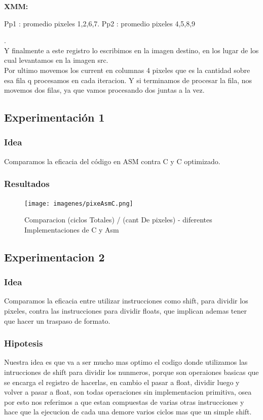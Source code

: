 \par{\textbf{XMM:}}
\par {Pp1 : promedio pixeles {1,2,6,7}. Pp2 : promedio pixeles {4,5,8,9}}
	
	
.\\ Y finalmente a este registro lo escribimos en la imagen destino, en los lugar de los cual levantamos en la imagen src. \\ Por ultimo movemos los current en columnas 4 pixeles que es la cantidad sobre esa fila q procesamos en cada iteracion. Y si terminamos de procesar la fila, nos movemos dos filas, ya que vamos procesando dos juntas a la vez.
	
\subsection{Experimentación 1}
\subsubsection{Idea}	
	Comparamos la eficacia del código en ASM contra C y C optimizado.
	
\subsubsection{Resultados}
	\begin{figure}[h!]
	\texttt{[image: imagenes/pixeAsmC.png]}
	\caption[center]{Comparacion (ciclos Totales) / (cant De pixeles) - diferentes Implementaciones de C y Asm}
\end{figure}

\subsection{Experimentacion 2}
\subsubsection{Idea}
Comparamos la eficacia entre utilizar instrucciones como shift, para dividir los pixeles, contra las instrucciones para dividir floats, que implican ademas tener que hacer un traspaso de formato.

\subsubsection{Hipotesis}
Nuestra idea es que va a ser mucho mas optimo el codigo donde utilizamos las intrucciones de shift para dividir los nunmeros, porque son operaiones basicas que se encarga el registro de hacerlas, en cambio el pasar a float, dividir luego y volver  a pasar a float, son todas operaciones sin implementacion primitiva, osea por esto nos referimos a que estan compuestas de varias otras instrucciones y hace que la ejecucion de cada una demore varios ciclos mas que un simple shift.

